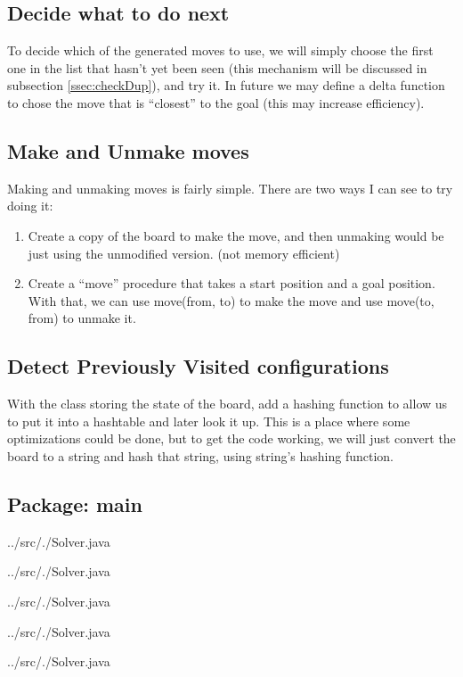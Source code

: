 \documentclass[a4paper]{article}
\newcommand{\sourceRoot}{../src/}
\newcommand{\myPackage}{}
\newcommand{\myJPackage}{}
\newcommand{\sourcePackage}[2]{  \subsection*{Package: #2}
                                 \renewcommand{\myPackage}{#1}
                                 \renewcommand{\myJPackage}{#2}}
\newcommand{\sourceClass}[1]{    
                                 {\sourceRoot\myPackage/#1}}
\begin{document}
\subsection{Decide what to do next}
To decide which of the generated moves to use, we will simply choose the first 
one in the list that hasn't yet been seen (this mechanism will be discussed in 
subsection \ref{ssec:checkDup}), and try it. In future we may define a delta 
function to chose the move that is ``closest'' to the goal (this may increase 
efficiency).

\subsection{Make and Unmake moves}
Making and unmaking moves is fairly simple. There are two ways I can see to try 
doing it: 
\begin{enumerate}
\item Create a copy of the board to make the move, and then unmaking would be 
      just using the unmodified version.  (not memory efficient)
\item Create a ``move'' procedure that takes a start position and a goal 
      position. With that, we can use move(from, to) to make the move and use 
      move(to, from) to unmake it. 
\end{enumerate}

\subsection{Detect Previously Visited configurations}
With the class storing the state of the board, add a hashing function to allow 
us to put it into a hashtable and later look it up. This is a place where some 
optimizations could be done, but to get the code working, we will just convert 
the board to a string and hash that string, using string's hashing function. 
\label{ssec:checkDup}
\sourcePackage{.}{main}
\sourceClass{Solver.java}
\sourceClass{Solver.java}
\sourceClass{Solver.java}
\sourceClass{Solver.java}
\sourceClass{Solver.java}
\end{document}
